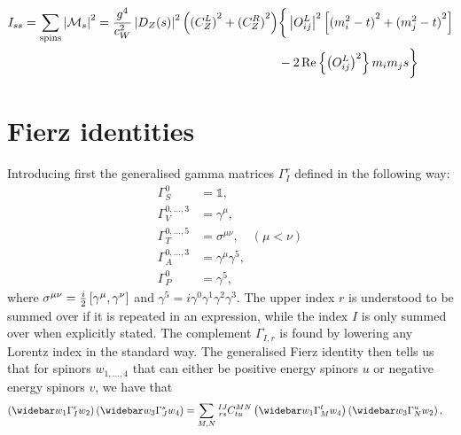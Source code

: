 \documentclass[english,notitlepage]{article}
\begin{document}
\begin{subequations}
    \begin{align} \nonumber
        I_{ss} = \sum_\text{spins} \left|\mathcal{M}_s\right|^2 = \frac{g^4}{c_W^2} \left|D_Z(s)\right|^2 \left({(C_Z^L)}^2+{(C_Z^R)}^2\right) & \bigg\{ \left|O_{ij}^L\right|^2 \left[ {(m_i^2-t)}^2 + {(m_j^2-t)}^2 \right] \\
                                                                                                                     & - 2\operatorname{Re}\left\{\left(O_{ij}^L\right)^2\right\} m_i m_j s \bigg\}
    \end{align}
\end{subequations}


\section{Fierz identities}
    Introducing first the generalised gamma matrices \(\Gamma_I^r\) defined in the following way:
    \begin{subequations}
        \begin{align}
            \Gamma_S^0            & = \mathbb{1},                        \\
            \Gamma_V^{0,\ldots,3} & = \gamma^\mu,                        \\
            \Gamma_T^{0,\ldots,5} & = \sigma^{\mu\nu}, \quad (\mu < \nu) \\
            \Gamma_A^{0,\ldots,3} & = \gamma^\mu \gamma^5,               \\
            \Gamma_P^0            & = \gamma^5,
        \end{align}
    \end{subequations}
    where \(\sigma^{\mu\nu} = \frac{i}{2} \left[\gamma^\mu, \gamma^\nu\right]\) and \(\gamma^5 = i \gamma^0 \gamma^1 \gamma^2 \gamma^3\). The upper index \(r\) is understood to be summed over if it is repeated in an expression, while the index \(I\) is only summed over when explicitly stated. The complement \(\Gamma_{I,r}\) is found by lowering any Lorentz index in the standard way.
    The generalised Fierz identity then tells us that for spinors \(w_{1,\ldots,4}\) that can either be positive energy spinors \(u\) or negative energy spinors \(v\), we have that
    \begin{align}
        \pclosed{\wbar{w}_1 \Gamma_I^r w_2} \pclosed{\wbar{w}_3 \Gamma_{J}^s w_4} & = \sum_{M,N} \tensor*[^{IJ}_{rs}]{C}{^{MN}_{tu}} \pclosed{\wbar{w}_1 \Gamma_M^t w_4} \pclosed{\wbar{w}_3 \Gamma_N^u w_2},
    \end{align}
\end{document}

